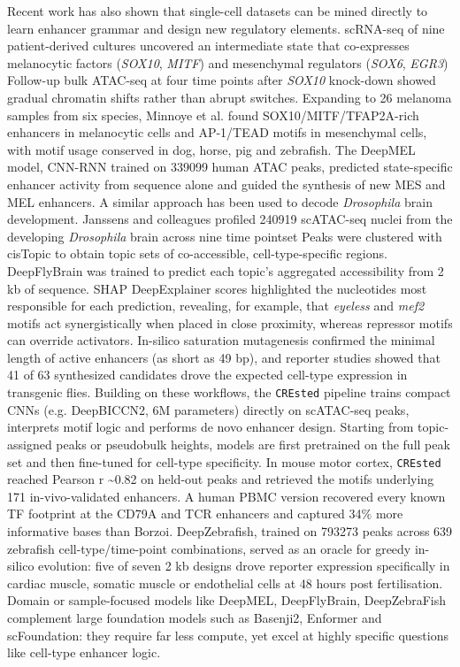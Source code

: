 Recent work has also shown that single-cell datasets can be mined directly to learn enhancer grammar and design new regulatory elements. scRNA-seq of nine patient-derived cultures uncovered an intermediate state that co-expresses melanocytic factors (\textit{SOX10}, \textit{MITF}) and mesenchymal regulators (\textit{SOX6}, \textit{EGR3}) Follow-up bulk ATAC-seq at four time points after \textit{SOX10} knock-down showed gradual chromatin shifts rather than abrupt switches. Expanding to 26 melanoma samples from six species, Minnoye et al. found SOX10/MITF/TFAP2A-rich enhancers in melanocytic cells and AP-1/TEAD motifs in mesenchymal cells, with motif usage conserved in dog, horse, pig and zebrafish. The DeepMEL model, CNN-RNN trained on \num{339099} human ATAC peaks, predicted state-specific enhancer activity from sequence alone and guided the synthesis of new MES and MEL enhancers. A similar approach has been used to decode \textit{Drosophila} brain development. Janssens and colleagues profiled \num{240919} scATAC-seq nuclei from the developing \textit{Drosophila} brain across nine time pointset Peaks were clustered with cisTopic to obtain topic sets of co-accessible, cell-type-specific regions. DeepFlyBrain was trained to predict each topic's aggregated accessibility from 2 kb of sequence. SHAP DeepExplainer scores highlighted the nucleotides most responsible for each prediction, revealing, for example, that \textit{eyeless} and \textit{mef2} motifs act synergistically when placed in close proximity, whereas repressor motifs can override activators. In-silico saturation mutagenesis confirmed the minimal length of active enhancers (as short as 49 bp), and reporter studies showed that 41 of 63 synthesized candidates drove the expected cell-type expression in transgenic flies. Building on these workflows, the \verb|CREsted| pipeline trains compact CNNs (e.g. DeepBICCN2, 6M parameters) directly on scATAC-seq peaks, interprets motif logic and performs de novo enhancer design. Starting from topic-assigned peaks or pseudobulk heights, models are first pretrained on the full peak set and then fine-tuned for cell-type specificity. In mouse motor cortex, \verb|CREsted| reached Pearson r \textasciitilde 0.82 on held-out peaks and retrieved the motifs underlying 171 in-vivo-validated enhancers. A human PBMC version recovered every known TF footprint at the CD79A and TCR\textalpha{} enhancers and captured 34\% more informative bases than Borzoi. DeepZebrafish, trained on \num{793273} peaks across \num{639} zebrafish cell-type/time-point combinations, served as an oracle for greedy in-silico evolution: five of seven 2 kb designs drove reporter expression specifically in cardiac muscle, somatic muscle or endothelial cells at 48 hours post fertilisation. Domain or sample-focused models like DeepMEL, DeepFlyBrain, DeepZebraFish complement large foundation models such as Basenji2, Enformer and scFoundation: they require far less compute, yet excel at highly specific questions like cell-type enhancer logic.

